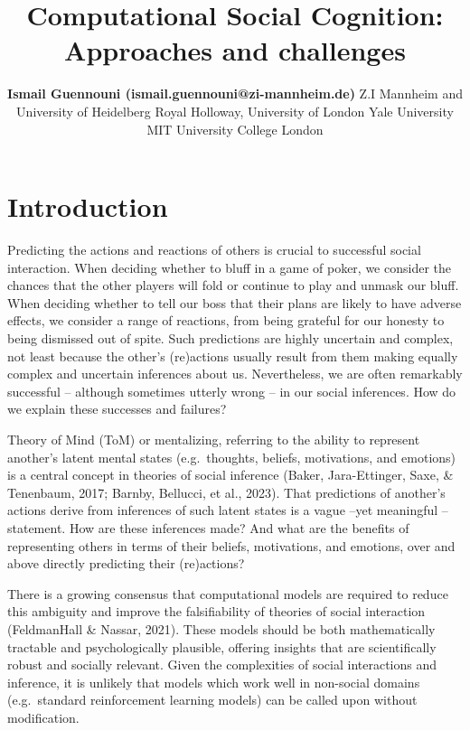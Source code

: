 \documentclass[10pt, letterpaper]{article}
\title{Computational Social Cognition: Approaches and challenges}
\author{{\large \bf Ismail Guennouni (ismail.guennouni@zi-mannheim.de)} Z.I Mannheim and University of Heidelberg \AND {\large \bf Joseph M Barnby (joseph.barnby@rhul.ac.uk)} Royal Holloway, University of London \AND {\large \bf Julian Jara-Ettinger (julian.jara-ettinger@yale.edu)} Yale University \AND {\large \bf Rebecca Saxe (saxe@mit.edu)} MIT \AND {\large \bf Maarten Speekenbrink (m.speekenbrink@ucl.ac.uk)} University College London}
\begin{document}
\maketitle

% 
% 

\hypertarget{introduction}{%
\section{Introduction}\label{introduction}}

Predicting the actions and reactions of others is crucial to successful
social interaction. When deciding whether to bluff in a game of poker,
we consider the chances that the other players will fold or continue to
play and unmask our bluff. When deciding whether to tell our boss that
their plans are likely to have adverse effects, we consider a range of
reactions, from being grateful for our honesty to being dismissed out of
spite. Such predictions are highly uncertain and complex, not least
because the other's (re)actions usually result from them making equally
complex and uncertain inferences about us. Nevertheless, we are often
remarkably successful -- although sometimes utterly wrong -- in our
social inferences. How do we explain these successes and failures?

Theory of Mind (ToM) or mentalizing, referring to the ability to
represent another's latent mental states (e.g.~thoughts, beliefs,
motivations, and emotions) is a central concept in theories of social
inference (Baker, Jara-Ettinger, Saxe, \& Tenenbaum, 2017; Barnby,
Bellucci, et al., 2023). That predictions of another's actions derive
from inferences of such latent states is a vague --yet meaningful --
statement. How are these inferences made? And what are the benefits of
representing others in terms of their beliefs, motivations, and
emotions, over and above directly predicting their (re)actions?

There is a growing consensus that computational models are required to
reduce this ambiguity and improve the falsifiability of theories of
social interaction (FeldmanHall \& Nassar, 2021). These models should be
both mathematically tractable and psychologically plausible, offering
insights that are scientifically robust and socially relevant. Given the
complexities of social interactions and inference, it is unlikely that
models which work well in non-social domains (e.g.~standard
reinforcement learning models) can be called upon without modification.
\end{document}
